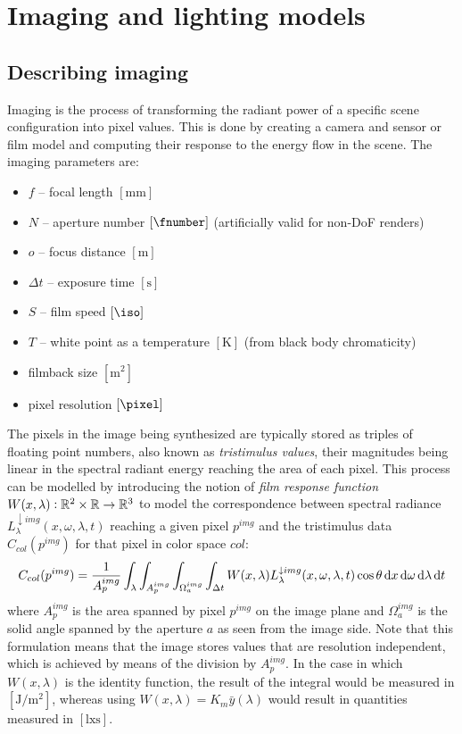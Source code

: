 
\chapter{Imaging and lighting models}\label{ch:lighting}
\section{Describing imaging}\label{ch:imaging}

Imaging is the process of transforming the radiant power of a specific scene
configuration into pixel values. This is done by creating a camera and sensor
or film model and computing their response to the energy flow in the scene.
The imaging parameters are:
\begin{itemize}
\item $f$ -- focal length $[\unit{\milli\meter}]$
\item $N$ -- aperture number $[\unit{\fnumber}]$  (artificially valid for
non-DoF renders)
\item $o$ -- focus distance $[\unit{\meter}]$
\item $\Delta t$ -- exposure time $[\unit{\second}]$
\item $S$ -- film speed $[\unit{\iso}]$
\item $T$ -- white point as a temperature $[\unit{\kelvin}]$  (from black body
chromaticity)
\item filmback size $[\unit{\square\meter}]$
\item pixel resolution $[\unit{\pixel}]$
\end{itemize}

The pixels in the image being synthesized are typically stored as triples of
floating point numbers, also known as \textsl{tristimulus values}, their
magnitudes being linear in the spectral radiant energy reaching the area of each
pixel.
This process can be modelled by introducing the notion of \textsl{film response
function} $W(x,\lambda): \mathbb{R}^2\times\mathbb{R} \to \mathbb{R}^3$ to model the correspondence
between spectral radiance $L^{\downarrow img}_{\lambda}(x, \omega, \lambda, t)$
reaching a given pixel $p^{img}$ and the tristimulus data $C_{col}(p^{img})$ for
that pixel in color space $col$:
\begin{equation}\label{eqn:imaging1}
C_{col}(p^{img})  = \frac1{A_p^{img}}\int_{\lambda} \int_{A_p^{img}}
\int_{\Omega^{img}_a} \int_{\Delta t} W(x, \lambda) L^{\downarrow
img}_{\lambda}(x, \omega, \lambda, t) \cos\theta\mathop{}\!\mathrm{d} x\mathop{}\!\mathrm{d}\omega\mathop{}\!\mathrm{d}\lambda\mathop{}\!\mathrm{d} t
\end{equation}
where $A_p^{img}$ is the area spanned by pixel $p^{img}$ on the image plane and
$\Omega^{img}_a$ is the solid angle spanned by the aperture $a$ as seen from
the image side.
Note that this formulation means that the image stores values that are
resolution independent, which is achieved by means of the division by
$A_p^{img}$. In the case in which $W(x, \lambda)$ is the identity function, the
result of the integral would be measured in $[\unit{\joule\per\square\meter}]$,
whereas using $W(x, \lambda) = K_m \bar y(\lambda)$ would result in quantities
measured in $[\unit{\lux\second}]$.

